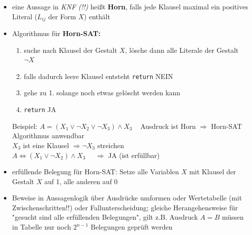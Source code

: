 \documentclass[10pt,a4paper]{article}
\begin{document}
\begin{itemize}
\item eine Aussage in \textit{KNF (!!)} heißt \textbf{Horn}, falls jede Klausel maximal ein positives Literal ($L_{ij}$ der Form $X$) enthält
\item Algorithmus für \textbf{Horn-SAT:} 
\begin{enumerate}
\item suche nach Klausel der Gestalt $X$, lösche dann alle Literale der Gestalt $\lnot X$
\item falls dadurch leere Klausel entsteht \texttt{return} NEIN
\item gehe zu 1. solange noch etwas gelöscht werden kann
\item \texttt{return} JA 
\end{enumerate}
Beispiel: $A=(X_{1}\lor \lnot X_{2}\lor \lnot X_{3})\land X_{3}\;\;\;$ Ausdruck ist Horn $\Rightarrow$ Horn-SAT Algorithmus anwendbar\\
$X_{3}$ ist eine Klausel $\Rightarrow \lnot X_{3}$ streichen \\
$A\Leftrightarrow (X_{1}\lor \lnot X_{2})\land X_{3}\;\;\;\;\; \Rightarrow$ JA (ist erfüllbar)
\item erfüllende Belegung für Horn-SAT: Setze alle Variablen $X$ mit Klausel der Gestalt $X$ auf 1, alle anderen auf 0
\item Beweise in Aussagenlogik über Ausdrücke umformen oder Wertetabelle (mit Zwischenschritten!!) oder Fallunterscheidung; gleiche Herangehensweise für "gesucht sind alle erfüllenden Belegungen", gilt z.B. Ausdruck $A=B$ müssen in Tabelle nur noch $2^{n-1}$ Belegungen geprüft werden
\end{itemize}
\end{document}
